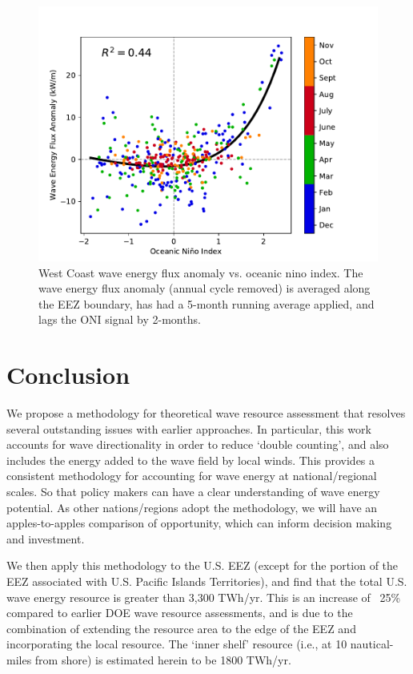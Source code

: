 \begin{figure}[ht]
  \centering
  \includegraphics[width=\textwidth]{../fig/ENSO-Comparison.wc.pdf}
  \caption{West Coast wave energy flux anomaly vs. oceanic nino index. The wave energy flux anomaly (annual cycle removed) is averaged along the EEZ boundary, has had a 5-month running average applied, and lags the ONI signal by 2-months.}
  \label{fig:wc-nino}
\end{figure}


\section{Conclusion} \label{sec:conclusion}

We propose a methodology for theoretical wave resource assessment that resolves several outstanding issues with earlier approaches. In particular, this work accounts for wave directionality in order to reduce `double counting', and also includes the energy added to the wave field by local winds. This provides a consistent methodology for accounting for wave energy at national/regional scales. So that policy makers can have a clear understanding of wave energy potential. As other nations/regions adopt the methodology, we will have an apples-to-apples comparison of opportunity, which can inform decision making and investment.

We then apply this methodology to the U.S. EEZ (except for the portion of the EEZ associated with U.S. Pacific Islands Territories), and find that the total U.S. wave energy resource is greater than 3,300 TWh/yr.
This is an increase of ~25\% compared to earlier DOE wave resource assessments, and is due to the combination of extending the resource area to the edge of the EEZ and incorporating the local resource. The `inner shelf' resource (i.e., at 10 nautical-miles from shore) is estimated herein to be 1800 TWh/yr.

